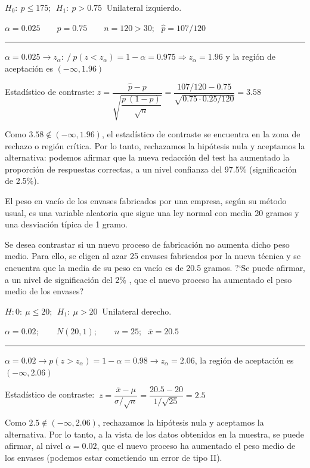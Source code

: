 $H_0:\ p\le 175;\ \ H_1:\ p>0.75\ $ Unilateral izquierdo.

$\alpha=0.025 \qquad p=0.75\qquad n=120>30;\ \ \ \widehat p=107/120$

\rule{150pt}{0.1pt}

$\alpha=0.025 \to z_\alpha:\ / \ p(z<z_\alpha)=1-\alpha=0.975 \Rightarrow z_\alpha=1.96$ y la región de aceptación es $(-\infty, 1.96)$

Estadístico de contraste: $z=\dfrac{\widehat p -p}{\sqrt{\dfrac{p\ (1-p)}{\sqrt{n}}}}=\dfrac{107/120 - 0.75}{\sqrt{0.75 \cdot 0.25/120}}=3.58$


Como $3.58 \notin (-\infty,1.96)$, el estadístico de contraste se encuentra en la zona de rechazo o región crítica. Por lo tanto, rechazamos la hipótesis nula y aceptamos la alternativa: podemos afirmar que la nueva redacción del test ha aumentado la proporción de respuestas correctas, a un nivel confianza del 97.5\% (significación de 2.5\%).
\vspace{4mm}
\begin{ejemplo}
\begin{ejer}
	El peso en vacío de los envases fabricados por una empresa, según su método usual, es una variable aleatoria que sigue una ley normal con media 20 gramos y una desviación típica de 1 gramo.
	
Se desea contrastar si un nuevo proceso de fabricación no aumenta dicho peso medio. Para ello, se eligen al azar 25 envases fabricados por la nueva técnica y se encuentra que la media de su peso en vacío es de 20.5 gramos. ?`Se puede afirmar, a un nivel de significación del 2\% , que el nuevo proceso ha aumentado el peso medio de los envases?
\end{ejer}
\end{ejemplo}

$H:0:\ \mu \le 20;\ \ H_1:\ \mu>20\ $ Unilateral derecho.

$\alpha=0.02;\qquad N(20,1);\qquad n=25 ;\ \ \ \bar x=20.5$

\rule{150pt}{0.1pt}

$\alpha=0.02 \to p(z>z_\alpha)=1-\alpha=0.98 \to z_\alpha=2.06$, la región de aceptación es $(-\infty, 2.06)$

Estadístico de contraste:  $\ z=\dfrac{\bar x - \mu}{\sigma/\sqrt{n}}=\dfrac{20.5-20}{1/\sqrt{25}}=2.5$

Como $2.5 \notin (-\infty,2.06)$, rechazamos la hipótesis nula y aceptamos la alternativa. Por lo tanto, a la vista de los datos obtenidos en la muestra, se puede afirmar, al nivel $\alpha=0.02$, que el nuevo proceso ha aumentado el peso medio de los envases (podemos estar cometiendo un error de tipo II).



